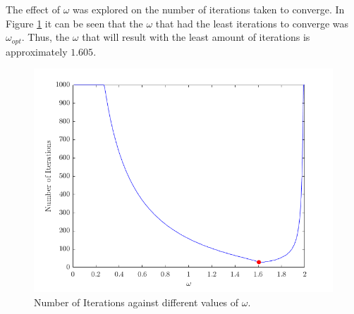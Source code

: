 \documentclass[12pt,a4paper]{article}
\begin{document}
The effect of $\omega$ was explored on the number of iterations taken to converge. In Figure \ref{fig:omega2} it can be seen that the $\omega$ that had the least iterations to converge was $\omega_{opt}$. Thus, the $\omega$ that will result with the least amount of iterations is approximately $1.605$.

\begin{figure}[H]
	\includegraphics[width=\linewidth]{images/omegaGraph2.png}
	\caption{Number of Iterations against different values of $\omega$.}
	\label{fig:omega2}
\end{figure}
\end{document}
